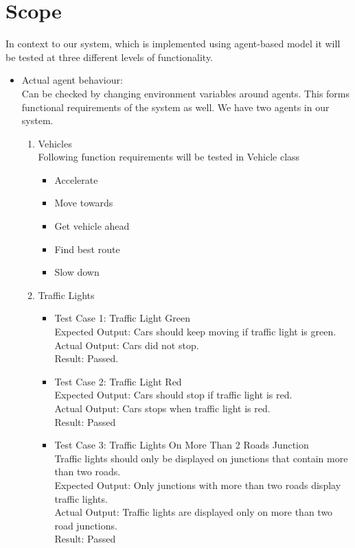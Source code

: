 \documentclass[11pt, oneside]{article}   	%
\begin{document}
\section{Scope}
In context to our system, which is implemented using agent-based model it will be tested at three different levels of functionality.
\begin{itemize}
\item Actual agent behaviour: \hfill \\
Can be checked by changing environment variables around agents.
This forms functional requirements of the system as well. We have two agents in our system. \begin{enumerate}
\item Vehicles\hfill \\
Following function requirements will be tested in Vehicle class

\begin{itemize}
	\item Accelerate
	\item Move towards
	\item Get vehicle ahead
	\item Find best route
	\item Slow down
\end{itemize}

\item Traffic Lights
\begin{itemize}
\item Test Case 1: Traffic Light Green \hfill \\
Expected Output:
Cars should keep moving if traffic light is green.\hfill \\
Actual Output:
Cars did not stop.\hfil \\
Result:
Passed.
\item Test Case 2: Traffic Light Red\hfill \\
 Expected Output: Cars should stop if traffic light is red.\hfill \\
 Actual Output: Cars stops when traffic light is red.\hfill \\
 Result: Passed
 
 \item Test Case 3: Traffic Lights On More Than 2 Roads Junction\hfill \\
 Traffic lights should only be displayed on junctions that contain more than two roads.\hfill \\
 Expected Output: Only junctions with more than two roads display traffic lights.\hfill \\
 Actual Output: Traffic lights are displayed only on more than two road junctions.\hfill \\
 Result: Passed
\end{itemize}


\end{enumerate}
\end{itemize}
\end{document}
